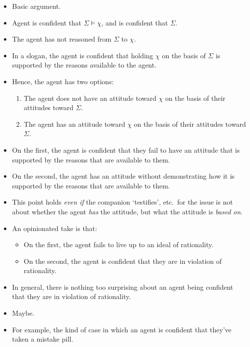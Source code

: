 \documentclass[10pt]{article}
\begin{document}
\begin{itemize}
\item Basic argument.
\item Agent is confident that \(\Sigma \vDash \chi\), and is confident that \(\Sigma\).
\item The agent has not reasoned from \(\Sigma\) to \(\chi\).
\item In a slogan, the agent is confident that holding \(\chi\) on the basis of \(\Sigma\) is supported by the reasons available to the agent.
\item Hence, the agent has two options:
  \begin{enumerate}
  \item The agent does not have an attitude toward \(\chi\) on the basis of their attitudes toward \(\Sigma\).
  \item The agent has an attitude toward \(\chi\) on the basis of their attitudes toward \(\Sigma\).
  \end{enumerate}
\item On the first, the agent is confident that they fail to have an attitude that is supported by the reasons that are available to them.
\item On the second, the agent has an attitude without demonstrating how it is supported by the reasons that are available to them.
\end{itemize}

\begin{itemize}
\item This point holds \emph{even if} the companion `testifies', etc.\ for the issue is not about whether the agent \emph{has} the attitude, but what the attitude is \emph{based on}.
\end{itemize}

\begin{itemize}
\item An opinionated take is that:
  \begin{itemize}
  \item On the first, the agent fails to live up to an ideal of rationality.
  \item On the second, the agent is confident that they are in violation of rationality.
  \end{itemize}
\end{itemize}

\begin{itemize}
\item In general, there is nothing too surprising about an agent being confident that they are in violation of rationality.
\item Maybe.
\item For example, the kind of case in which an agent is confident that they've taken a mistake pill.
\end{itemize}
\end{document}
